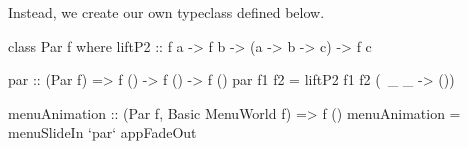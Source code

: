 Instead, we create our own  typeclass defined below.

\begin{code}
class Par f where
  liftP2 :: f a -> f b -> (a -> b -> c) -> f c
\end{code}

\begin{code}
par :: (Par f) => f () -> f () -> f ()
par f1 f2 = liftP2 f1 f2 (\ _ _ -> ())
\end{code}

\begin{code}
menuAnimation :: (Par f, Basic MenuWorld f) => f ()
menuAnimation = menuSlideIn `par` appFadeOut
\end{code}
